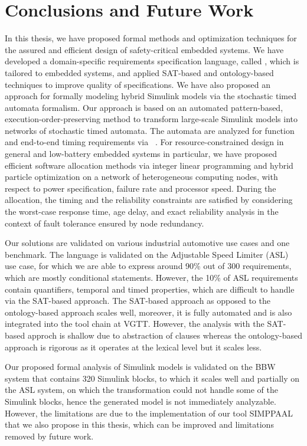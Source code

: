 \chapter{Conclusions and Future Work}
In this thesis, we have proposed formal methods and optimization techniques for the assured and efficient design of safety-critical embedded systems. We have developed a domain-specific requirements specification language, called \resa, which is tailored to embedded systems, and applied SAT-based and ontology-based techniques to improve quality of specifications. We have also proposed an approach for formally modeling hybrid Simulink models via the stochastic timed automata formalism. Our approach is based on an automated pattern-based, execution-order-preserving method to transform large-scale Simulink models into networks of stochastic timed automata. The automata are analyzed for function and end-to-end timing requirements via \uppaalsmc~\cite{Bulychev2012UPPAAL-SMC:Automata}. For resource-constrained design in general and low-battery embedded systems in particular, we have proposed efficient software allocation methods via integer linear programming and hybrid particle optimization on a network of heterogeneous computing nodes, with respect to power specification, failure rate and processor speed. During the allocation, the timing and the reliability constraints are satisfied by considering the worst-case response time, age delay, and exact reliability analysis in the context of fault tolerance ensured by node redundancy.

Our solutions are validated on various industrial automotive use cases and one benchmark. The \resa{} language is validated on the Adjustable Speed Limiter (ASL) use case, for which we are able to express around 90\% out of 300 requirements, which are mostly conditional statements. However, the 10\% of ASL requirements contain quantifiers, temporal and timed properties, which are difficult to handle via the SAT-based approach. The SAT-based approach as opposed to the ontology-based approach scales well, moreover, it is fully automated and is also integrated into the \eatop{} tool chain at VGTT. However, the analysis with the SAT-based approch is shallow due to abstraction of clauses whereas the ontology-based approach is rigorous as it operates at the lexical level but it scales less. 

Our proposed formal analysis of Simulink models is validated on the BBW system that contains 320 Simulink blocks, to which it scales well and partially on the ASL system, on which the transformation could not handle some of the Simulink blocks, hence the generated model is not immediately analyzable.  However, the limitations are due to the implementation of our tool SIMPPAAL that we also propose in this thesis, which can be improved and limitations removed by future work. 

